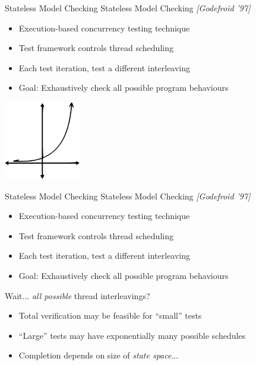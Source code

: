 \documentclass[xcolor=dvipsnames]{beamer}
\begin{document}
\begin{frame}{Stateless Model Checking}
	Stateless Model Checking {\em [Godefroid '97]}
	\begin{itemize}
		\item Execution-based concurrency testing technique
		\item Test framework controls thread scheduling
		\item Each test iteration, test a different interleaving
		\item Goal: Exhaustively check all possible program behaviours
	\end{itemize}
	\pause
	\linegap

	\begin{center}
	\includegraphics[width=0.25\textwidth]{exponential-curve.pdf}
	\end{center}
\end{frame}
\begin{frame}{Stateless Model Checking}
	Stateless Model Checking {\em [Godefroid '97]}
	\begin{itemize}
		\item Execution-based concurrency testing technique
		\item Test framework controls thread scheduling
		\item Each test iteration, test a different interleaving
		\item Goal: Exhaustively check all possible program behaviours
	\end{itemize}
	\linegap

	Wait... {\em all possible} thread interleavings?
	\begin{itemize}
		\item Total verification may be feasible for ``small'' tests
		\item ``Large'' tests may have exponentially many possible schedules
		\item Completion depends on size of {\em state space}...
	\end{itemize}
	\linegap

	\vspace{2.975em} %
\end{frame}
\end{document}
